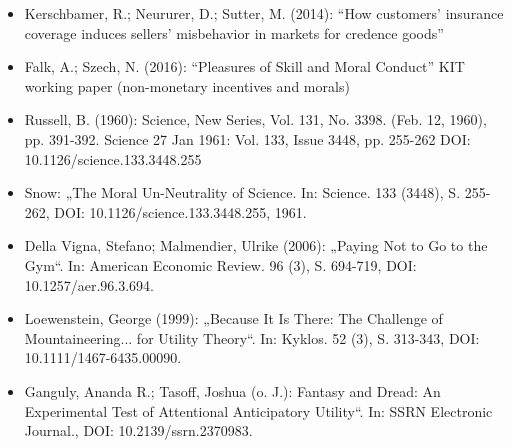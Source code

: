 \begin{multicols}{2}
\begin{itemize}
	\item Kerschbamer, R.; Neururer, D.; Sutter, M. (2014): “How customers' insurance coverage induces sellers' misbehavior in markets for credence goods”
	\item Falk, A.; Szech, N. (2016): “Pleasures of Skill and Moral Conduct” KIT working paper (non-monetary incentives and morals)
	\item Russell, B. (1960): Science, New Series, Vol. 131, No. 3398. (Feb. 12, 1960), pp. 391-392. Science  27 Jan 1961: Vol. 133, Issue 3448, pp. 255-262 DOI: 10.1126/science.133.3448.255
	\item Snow: „The Moral Un-Neutrality of Science. In: Science. 133 (3448), S. 255-262, DOI: 10.1126/science.133.3448.255, 1961.
	\item Della Vigna, Stefano; Malmendier, Ulrike (2006): „Paying Not to Go to the Gym“. In: American Economic Review. 96 (3), S. 694-719, DOI: 10.1257/aer.96.3.694.
	\item Loewenstein, George (1999): „Because It Is There: The Challenge of Mountaineering... for Utility Theory“. In: Kyklos. 52 (3), S. 313-343, DOI: 10.1111/1467-6435.00090.
	\item Ganguly, Ananda R.; Tasoff, Joshua (o. J.): Fantasy and Dread: An Experimental Test of Attentional Anticipatory Utility“. In: SSRN Electronic Journal., DOI: 10.2139/ssrn.2370983.
\end{itemize}
\end{multicols}
